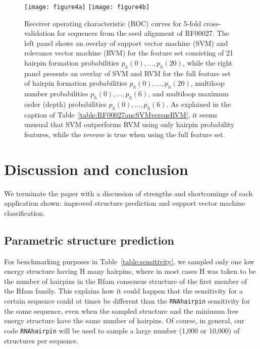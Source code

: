 \begin{figure*}[tbhp]
\centering
\texttt{[image: figure4a]}
\hskip 1cm
\texttt{[image: figure4b]}
\caption{Receiver operating characteristic (ROC) curves for
5-fold cross-validation for sequences from the seed alignment of
RF00027.
The left panel shows an overlay of support vector machine (SVM) and
relevance vector machine (RVM) for the feature set consisting of
21 hairpin formation probabilities $p_h(0),\ldots,p_h(20)$,
while the right panel presents an overlay of SVM and RVM for the
full feature set of hairpin formation probabilities $p_h(0),\ldots,p_h(20)$,
multiloop number probabilities $p_h(0),\ldots,p_h(6)$, and
multiloop maximum order (depth) probabilities $p_h(0),\ldots,p_h(6)$.
As explained in the caption of Table~\ref{table:RF00027aucSVMversusRVM},
it seems unusual that SVM outperforms RVM using only hairpin probability
features, while the reverse is true when using the full feature set.
}
\label{fig:RF00027aucSVMversusRVM}
\end{figure*}


\section{Discussion and conclusion}
\label{section:discussion}

We terminate the paper with a discussion of strengths and shortcomings
of each application shown: improved structure prediction and
support vector machine classification.

\subsection*{Parametric structure prediction}

For benchmarking purposes in Table~\ref{table:sensitivity}, we
sampled only one low energy structure having H many hairpins, where
in most cases H was taken to be the number of hairpins in the Rfam
consensus structure of the first member of the Rfam family. This explains
how it could happen that the {\rnahairpin} sensitivity for a certain
sequence could at times be different than the {\tt RNAhairpin} sensitivity
for the same sequence, even when the sampled structure and the minimum
free energy structure have the same number of hairpins.
Of course, in general, our code {\tt RNAhairpin} will be used to
sample a large number (1,000 or 10,000) of structures per
sequence.

